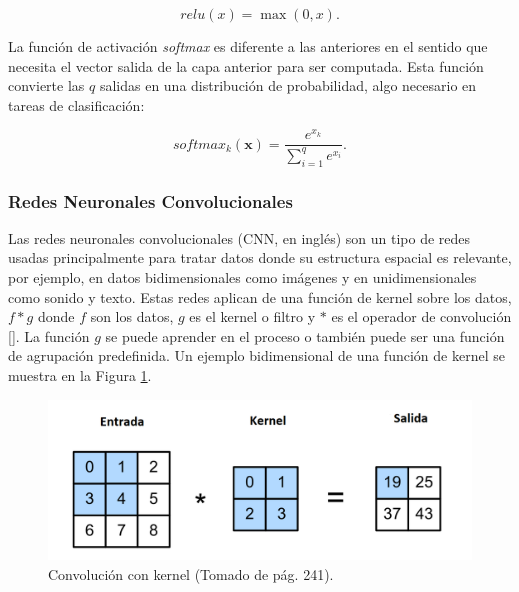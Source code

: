 \begin{equation}
	relu(x) = \max(0, x).
\end{equation}

La función de activación \emph{softmax} es diferente a las anteriores en el sentido que necesita
el vector salida de la capa anterior para ser computada. Esta función convierte las $q$ salidas
en una distribución de probabilidad, algo necesario en tareas de clasificación:

\begin{equation}
	softmax_k(\textbf{x}) = \frac{e^{x_k}}{\sum\limits_{i=1}^{q} e^{x_i}}.
\end{equation}

\subsubsection{Redes Neuronales Convolucionales}

Las redes neuronales convolucionales (CNN, en inglés) 
son un tipo de redes usadas
principalmente para tratar datos donde su estructura espacial es relevante, por ejemplo,
en datos bidimensionales como imágenes y en unidimensionales como sonido y texto.
Estas redes aplican de una función de kernel sobre los datos, $f * g$ donde $f$ son los
datos, $g$ es el kernel o filtro y $*$ es el operador de convolución [\cite{d2l}]. La función $g$ se puede 
aprender en el proceso o también puede ser una función de agrupación predefinida. 
Un ejemplo bidimensional de una función de kernel se muestra en la Figura \ref{fig:conv_kernel}.

\begin{figure}[h!]
	\begin{center}
		\begin{center}
			\includegraphics[scale=.4]{Graphics/kernel_convolution.png}
        \end{center}
	    \caption{Convolución con kernel (Tomado de \textcite{d2l} pág. 241).}\label{fig:conv_kernel}
	\end{center}
\end{figure}

